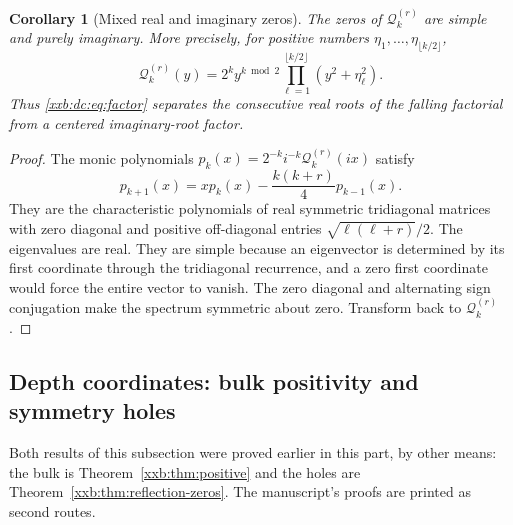 \documentclass[11pt,a4paper]{article}
\numberwithin{equation}{section}
\newtheorem{corollary}[theorem]{Corollary}
\theoremstyle{definition}
\theoremstyle{remark}
\theoremstyle{plain}
\begin{document}
\begin{corollary}[Mixed real and imaginary zeros]\label{xxb:dc:cor:imaginary}
The zeros of $\mathcal Q_k^{(r)}$ are simple and purely imaginary.  More
precisely, for positive numbers $\eta_1,\ldots,\eta_{\lfloor k/2\rfloor}$,
\[
 \mathcal Q_k^{(r)}(y)=2^ky^{k\bmod2}
 \prod_{\ell=1}^{\lfloor k/2\rfloor}(y^2+\eta_\ell^2).
\]
Thus \eqref{xxb:dc:eq:factor} separates the consecutive real roots of the
falling factorial from a centered imaginary-root factor.
\end{corollary}
\begin{proof}
The monic polynomials $p_k(x)=2^{-k}i^{-k}\mathcal Q_k^{(r)}(ix)$ satisfy
\[
 p_{k+1}(x)=xp_k(x)-\frac{k(k+r)}4p_{k-1}(x).
\]
They are the characteristic polynomials of real symmetric tridiagonal
matrices with zero diagonal and positive off-diagonal entries
$\sqrt{\ell(\ell+r)}/2$.  The eigenvalues are real.  They are simple because an
eigenvector is determined by its first coordinate through the tridiagonal
recurrence, and a zero first coordinate would force the entire vector to
vanish.  The zero diagonal and alternating sign conjugation make the
spectrum symmetric about zero.  Transform back to $\mathcal Q_k^{(r)}$.
\end{proof}

\subsection{Depth coordinates: bulk positivity and symmetry holes}\label{xxb:dc:sec:bulk}

Both results of this subsection were proved earlier in this part, by other
means: the bulk is Theorem~\ref{xxb:thm:positive} and the holes are
Theorem~\ref{xxb:thm:reflection-zeros}.  The manuscript's proofs are printed
as second routes.
\end{document}
